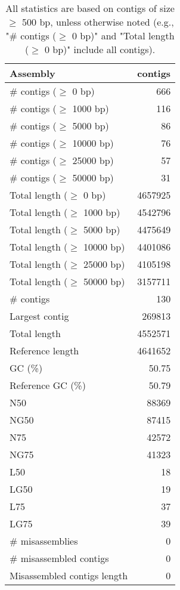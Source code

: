 \documentclass[12pt,a4paper]{article}
\begin{document}
\begin{table}[ht]
\begin{center}
\caption{All statistics are based on contigs of size $\geq$ 500 bp, unless otherwise noted (e.g., "\# contigs ($\geq$ 0 bp)" and "Total length ($\geq$ 0 bp)" include all contigs).}
\begin{tabular}{|l*{1}{|r}|}
\hline
Assembly & contigs \\ \hline
\# contigs ($\geq$ 0 bp) & 666 \\ \hline
\# contigs ($\geq$ 1000 bp) & 116 \\ \hline
\# contigs ($\geq$ 5000 bp) & 86 \\ \hline
\# contigs ($\geq$ 10000 bp) & 76 \\ \hline
\# contigs ($\geq$ 25000 bp) & 57 \\ \hline
\# contigs ($\geq$ 50000 bp) & 31 \\ \hline
Total length ($\geq$ 0 bp) & 4657925 \\ \hline
Total length ($\geq$ 1000 bp) & 4542796 \\ \hline
Total length ($\geq$ 5000 bp) & 4475649 \\ \hline
Total length ($\geq$ 10000 bp) & 4401086 \\ \hline
Total length ($\geq$ 25000 bp) & 4105198 \\ \hline
Total length ($\geq$ 50000 bp) & 3157711 \\ \hline
\# contigs & 130 \\ \hline
Largest contig & 269813 \\ \hline
Total length & 4552571 \\ \hline
Reference length & 4641652 \\ \hline
GC (\%) & 50.75 \\ \hline
Reference GC (\%) & 50.79 \\ \hline
N50 & 88369 \\ \hline
NG50 & 87415 \\ \hline
N75 & 42572 \\ \hline
NG75 & 41323 \\ \hline
L50 & 18 \\ \hline
LG50 & 19 \\ \hline
L75 & 37 \\ \hline
LG75 & 39 \\ \hline
\# misassemblies & 0 \\ \hline
\# misassembled contigs & 0 \\ \hline
Misassembled contigs length & 0 \\ \hline

\end{tabular}
\end{center}
\end{table}
\end{document}
